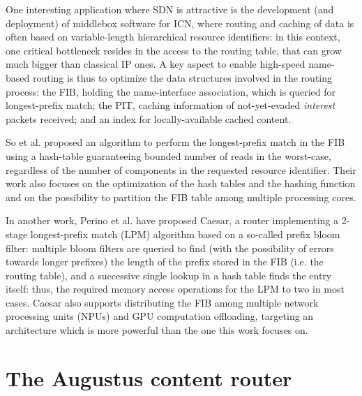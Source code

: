 \documentclass[11pt,a4paper,twoside,titlepage,openany]{book}
\begin{document}

One interesting application where SDN is attractive is the development (and deployment) of middlebox software for \gls{ICN}, where routing and caching of data is often based on variable-length hierarchical resource identifiers: in this context, one critical bottleneck resides in the access to the routing table, that can grow much bigger than classical IP ones.
A key aspect to enable high-speed name-based routing is thus to optimize the data structures involved in the routing process: the \gls{FIB}, holding the name-interface association, which is queried for longest-prefix match; the \gls{PIT}, caching information of not-yet-evaded \emph{interest} packets received; and an index for locally-available cached content.

So et al. \cite{ndn_fast_dosresistant} proposed an algorithm to perform the longest-prefix match in the \gls{FIB} using a hash-table guaranteeing bounded number of reads in the worst-case, regardless of the number of components in the requested resource identifier. Their work also focuses on the optimization of the hash tables and the hashing function and on the possibility to partition the \gls{FIB} table among multiple processing cores.

In another work, Perino et al. \cite{caesar} have proposed Caesar, a router implementing a 2-stage longest-prefix match (LPM) algorithm based on a so-called prefix bloom filter: multiple bloom filters are queried to find (with the possibility of errors towards longer prefixes) the length of the prefix stored in the \gls{FIB} (i.e. the routing table), and a successive single lookup in a hash table finds the entry itself: thus, the required memory access operations for the LPM to two in most cases. Caesar also supports distributing the \gls{FIB} among multiple network processing units (NPUs) and GPU computation offloading, targeting an architecture which is more powerful than the one this work focuses on.



\chapter{The Augustus content router}
\label{chap:augustus}
\end{document}
